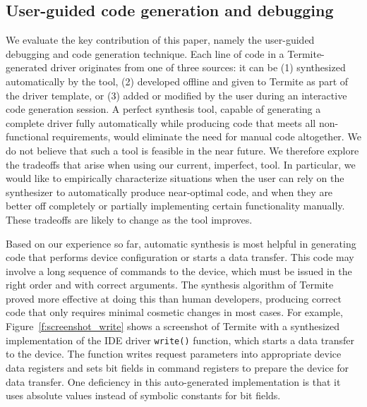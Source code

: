 \documentclass[a4paper,twoside,openright,11pt]{book}
\newcommand{\termite}{Termite\xspace}
\theoremstyle{definition}
\newcommand{\src}[1]{\texttt{\small #1}}
\begin{document}

\subsection{User-guided code generation and debugging} 
We evaluate the key contribution of this paper, namely the user-guided debugging and code generation technique.  Each line of code in a \termite-generated driver originates from one of three sources: it can be (1) synthesized automatically by the tool, (2) developed offline and given to \termite as part of the driver template, or (3) added or modified by the user during an interactive code generation session.  A perfect synthesis tool, capable of generating a complete driver fully automatically while producing code that meets all non-functional requirements, would eliminate the need for manual code altogether.  We do not believe that such a tool is feasible in the near future.  We therefore explore the tradeoffs that arise when using our current, imperfect, tool.  In particular, we would like to empirically characterize situations when the user can rely on the synthesizer to automatically produce near-optimal code, and when they are better off completely or partially implementing certain functionality manually.  These tradeoffs are likely to change as the tool improves.

Based on our experience so far, automatic synthesis is most helpful in generating code that performs device configuration or starts a data transfer.  This code may involve a long sequence of commands to the device, which must be issued in the right order and with correct arguments.  The synthesis algorithm of \termite proved more effective at doing this than human developers, producing correct code that only requires minimal cosmetic changes in most cases.  For example, Figure~\ref{f:screenshot_write} shows a screenshot of \termite with a synthesized implementation of the IDE driver \src{write()} function, which starts a data transfer to the device.  The function writes request parameters into appropriate device data registers and sets bit fields in command registers to prepare the device for data transfer.  One deficiency in this auto-generated implementation is that it uses absolute values instead of symbolic constants for bit fields.
\end{document}
